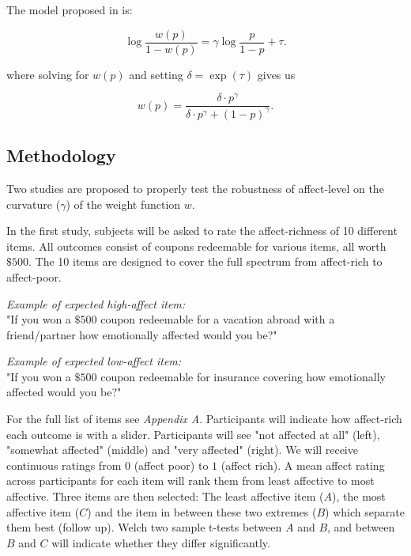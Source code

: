 \documentclass[12pt]{article}
\begin{document}
\vspace{3mm}

The model proposed in \textcite{gonzalez1999shape} is:

\[
	\log\frac{w(p)}{1-w(p)} =
	\gamma \log\frac{p}{1-p} + \tau
.\]

where solving for $w(p)$ and setting $\delta = \exp(\tau)$
gives us

\[
	w(p) = \frac{\delta \cdot p^{\gamma}}
	{\delta \cdot p^{\gamma} +
	(1-p)^{\gamma}}
.\]

\subsection{Methodology}

Two studies are proposed to
properly test the robustness
of affect-level on the
curvature ($\gamma$) of the
weight function $w$.

\vspace{3mm}

In the first study, subjects will be asked to
rate the affect-richness of 10 different
items.
All outcomes
consist of coupons redeemable
for various items, all worth $\$500$.
The 10 items are designed to cover the
full spectrum from affect-rich to
affect-poor.

\vspace{3mm}

\emph{Example of expected high-affect item:} \\
"If you won a $\$500$ coupon redeemable
for a vacation abroad with a friend/partner
how emotionally
affected would you be?"

\vspace{3mm}

\emph{Example of expected low-affect item:} \\
"If you won a $\$500$ coupon redeemable
for insurance covering how emotionally
affected would you be?"

\vspace{3mm}

For the full list of items see \emph{Appendix A}.
Participants
will indicate how affect-rich
each outcome is with a slider. Participants will
see "not affected at all" (left),
"somewhat affected" (middle)
and "very affected" (right).
We will receive continuous ratings from $0$
(affect poor) to $1$ (affect rich). A mean
affect rating across participants for each
item will rank them from least affective to
most affective. Three items are
then selected: The least affective item ($A$),
the most affective item ($C$) and the item in
between these two extremes ($B$) which separate them
best (follow up). Welch two sample t-tests
between $A$ and  $B$,
and between $B$ and  $C$ will indicate whether
they differ significantly.
\end{document}
